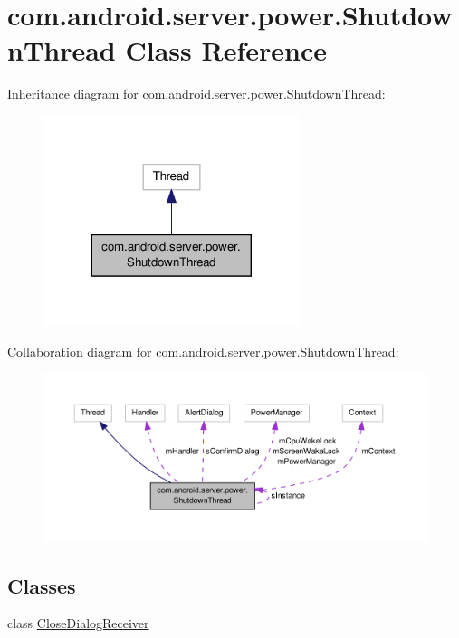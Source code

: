 \hypertarget{classcom_1_1android_1_1server_1_1power_1_1ShutdownThread}{\section{com.\-android.\-server.\-power.\-Shutdown\-Thread Class Reference}
\label{classcom_1_1android_1_1server_1_1power_1_1ShutdownThread}
}


Inheritance diagram for com.\-android.\-server.\-power.\-Shutdown\-Thread\-:
\nopagebreak
\begin{figure}[H]
\begin{center}
\leavevmode
\includegraphics[width=212pt]{classcom_1_1android_1_1server_1_1power_1_1ShutdownThread__inherit__graph}
\end{center}
\end{figure}


Collaboration diagram for com.\-android.\-server.\-power.\-Shutdown\-Thread\-:
\nopagebreak
\begin{figure}[H]
\begin{center}
\leavevmode
\includegraphics[width=350pt]{classcom_1_1android_1_1server_1_1power_1_1ShutdownThread__coll__graph}
\end{center}
\end{figure}
\subsection*{Classes}
\begin{DoxyCompactItemize}
\item 
class \hyperlink{classcom_1_1android_1_1server_1_1power_1_1ShutdownThread_1_1CloseDialogReceiver}{Close\-Dialog\-Receiver}
\end{DoxyCompactItemize}
